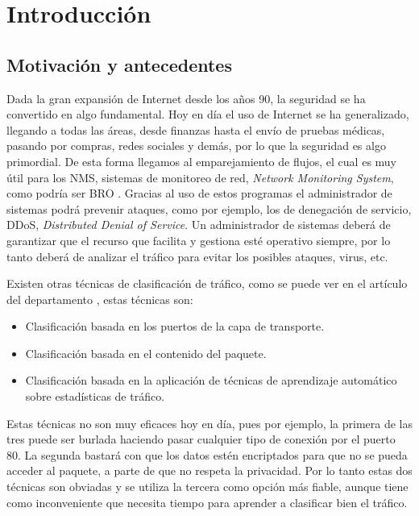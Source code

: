 \chapter{Introducción}


\section{Motivación y antecedentes}

Dada la gran expansión de Internet desde los años 90, la seguridad se ha convertido en algo 
fundamental. Hoy en día el uso de Internet se ha generalizado, llegando a todas las áreas, 
desde finanzas hasta el envío de pruebas médicas, pasando por compras, redes sociales y demás, 
por lo que la seguridad es algo primordial. 
\intro De esta forma llegamos al emparejamiento de flujos, el cual es muy útil para los NMS, 
sistemas de monitoreo de red, \textit{Network Monitoring System}, como podría ser BRO \cite{broindex}.
Gracias al uso de estos programas el administrador de sistemas podrá prevenir ataques, como por ejemplo, los 
de denegación de servicio, DDoS, \textit{Distributed Denial of Service}. Un administrador de sistemas deberá de 
garantizar que el recurso que facilita y gestiona esté operativo siempre, por lo tanto deberá de analizar el 
tráfico para evitar los posibles ataques, virus, etc.


\intro Existen otras técnicas de clasificación de tráfico, como se puede ver en el artículo del 
departamento \citep{comparacion}, estas técnicas son: 

\begin{itemize}
\item Clasificación basada en los puertos de la capa de transporte. \cite{iana}
\item Clasificación basada en el contenido del paquete. \cite{payload}
\item Clasificación basada en la aplicación de técnicas de aprendizaje automático sobre estadísticas de tráfico. \cite{learning}
\end{itemize}
Estas técnicas no son muy eficaces hoy en día, pues por ejemplo, la primera de las tres puede ser burlada 
haciendo pasar cualquier tipo de conexión por el puerto 80. La segunda bastará con que los datos estén 
encriptados para que no se pueda acceder al paquete, a parte de que no respeta la privacidad. Por lo tanto estas 
dos técnicas son obviadas y se utiliza la tercera como opción más fiable, aunque tiene como inconveniente que 
necesita tiempo para aprender a clasificar bien el tráfico.

